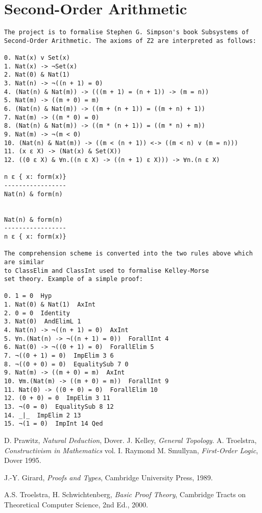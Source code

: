 \documentclass[a4paper,12pt,leqno]{article}
\numberwithin{equation}{section}
\begin{document}
\section*{Second-Order Arithmetic}

\begin{verbatim}
The project is to formalise Stephen G. Simpson's book Subsystems of 
Second-Order Arithmetic. The axioms of Z2 are interpreted as follows:

0. Nat(x) v Set(x) 
1. Nat(x) -> ¬Set(x) 
2. Nat(0) & Nat(1) 
3. Nat(n) -> ¬((n + 1) = 0) 
4. (Nat(n) & Nat(m)) -> (((m + 1) = (n + 1)) -> (m = n)) 
5. Nat(m) -> ((m + 0) = m) 
6. (Nat(n) & Nat(m)) -> ((m + (n + 1)) = ((m + n) + 1)) 
7. Nat(m) -> ((m * 0) = 0) 
8. (Nat(n) & Nat(m)) -> ((m * (n + 1)) = ((m * n) + m)) 
9. Nat(m) -> ¬(m < 0) 
10. (Nat(n) & Nat(m)) -> ((m < (n + 1)) <-> ((m < n) v (m = n))) 
11. (x ε X) -> (Nat(x) & Set(X)) 
12. ((0 ε X) & ∀n.((n ε X) -> ((n + 1) ε X))) -> ∀n.(n ε X) 

n ε { x: form(x)}
-----------------
Nat(n) & form(n)


Nat(n) & form(n)
-----------------
n ε { x: form(x)}

The comprehension scheme is converted into the two rules above which are similar
to ClassElim and ClassInt used to formalise Kelley-Morse
set theory. Example of a simple proof:

0. 1 = 0  Hyp 
1. Nat(0) & Nat(1)  AxInt 
2. 0 = 0  Identity 
3. Nat(0)  AndElimL 1
4. Nat(n) -> ¬((n + 1) = 0)  AxInt 
5. ∀n.(Nat(n) -> ¬((n + 1) = 0))  ForallInt 4
6. Nat(0) -> ¬((0 + 1) = 0)  ForallElim 5
7. ¬((0 + 1) = 0)  ImpElim 3 6
8. ¬((0 + 0) = 0)  EqualitySub 7 0
9. Nat(m) -> ((m + 0) = m)  AxInt 
10. ∀m.(Nat(m) -> ((m + 0) = m))  ForallInt 9
11. Nat(0) -> ((0 + 0) = 0)  ForallElim 10
12. (0 + 0) = 0  ImpElim 3 11
13. ¬(0 = 0)  EqualitySub 8 12
14. _|_  ImpElim 2 13
15. ¬(1 = 0)  ImpInt 14 Qed

\end{verbatim}


\begin{thebibliography}{1}
 D. Prawitz, \emph{Natural Deduction}, Dover.
 J. Kelley, \emph{General Topology}.
 A. Troelstra, \emph{Constructivism in Mathematics} vol. I.	
Raymond M. Smullyan,
\textit{First-Order Logic}, Dover 1995.

J.-Y. Girard,
\textit{Proofs and Types}, Cambridge University Press, 1989.


A.S. Troelstra, H. Schwichtenberg,
\textit{Basic Proof Theory}, Cambridge Tracts on Theoretical Computer Science, 2nd Ed., 2000.

	
\end{thebibliography}



 
 
\end{document}
